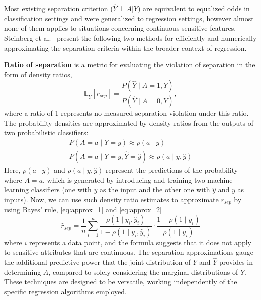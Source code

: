 Most existing separation criterion ($\hat{Y}\perp A | Y$) are equivalent to equalized odds in classification settings and were generalized to regression settings, however almost none of them applies to situations concerning continuous sensitive features. Steinberg et al.~\cite{steinberg2020fairness} present the following two methods for efficiently and numerically approximating the separation criteria within the broader context of regression. 

\textbf{Ratio of separation} is a metric for evaluating the violation of separation in the form of density ratios,
\begin{equation}
\mathbb{E}_{\hat{Y}}[r_{sep}] = \frac{P(\hat{Y} \mid A=1, Y)}{P(\hat{Y} \mid A=0, Y)},
\end{equation}
where a ratio of 1 represents no measured separation violation under this ratio. The probability densities are approximated by density ratios from the outputs of two probabilistic classifiers:
\begin{gather}
\label{eq:approx_1}
P(A = a \mid Y = y) \approx \rho(a \mid y) \\
\label{eq:approx_2}
P(A = a \mid Y = y, \hat{Y} = \hat{y}) \approx \rho(a \mid y, \hat{y})
\end{gather}
Here, $\rho(a \mid y)$ and $\rho(a \mid y, \hat{y})$ represent the predictions of the probability where $A=a$, which is generated by introducing and training two machine learning classifiers (one with $y$ as the input and the other one with $\hat{y}$ and $y$ as inputs). Now, we can use such density ratio estimates to approximate $r_{sep}$ by using Bayes’ rule, \eqref{eq:approx_1} and \eqref{eq:approx_2}
\begin{equation}\label{rsep}
\hat{r}_{sep} = \frac{1}{n} \sum_{i=1}^{n} \frac{\rho(1 \mid y_i, \hat{y}_i)}{1-\rho(1 \mid y_i, \hat{y}_i)} \cdot \frac{1-\rho(1 \mid y_i)}{\rho(1 \mid y_i)}
\end{equation}
where $i$ represents a data point, and the formula suggests that it does not apply to sensitive attributes that are continuous. The separation approximations gauge the additional predictive power that the joint distribution of $Y$ and $\hat{Y}$ provides in determining $A$, compared to solely considering the marginal distributions of $Y$. These techniques are designed to be versatile, working independently of the specific regression algorithms employed. 

